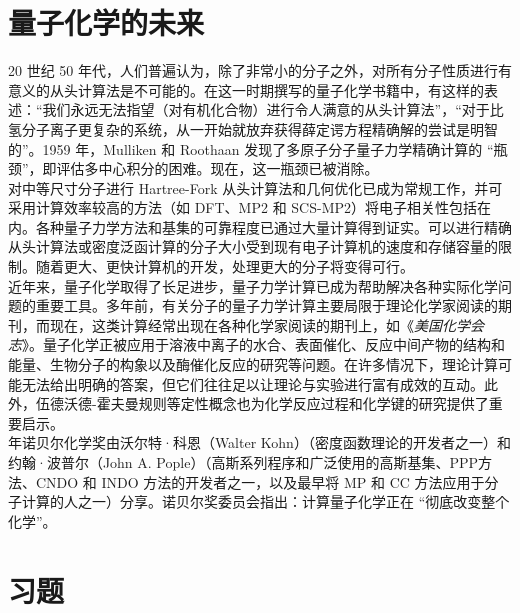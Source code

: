 \section{量子化学的未来}
\label{sec:17.8 The Future of Quantum Chemistry}
	20 世纪 50 年代，人们普遍认为，除了非常小的分子之外，对所有分子性质进行有意义的从头计算法是不可能的。在这一时期撰写的量子化学书籍中，有这样的表述：“我们永远无法指望（对有机化合物）进行令人满意的从头计算法”，“对于比氢分子离子更复杂的系统，从一开始就放弃获得薛定谔方程精确解的尝试是明智的”。1959 年，Mulliken 和 Roothaan 发现了多原子分子量子力学精确计算的 “瓶颈”，即评估多中心积分的困难。现在，这一瓶颈已被消除。\\
	\indent 对中等尺寸分子进行 Hartree-Fork 从头计算法和几何优化已成为常规工作，并可采用计算效率较高的方法（如 DFT、MP2 和 SCS-MP2）将电子相关性包括在内。各种量子力学方法和基集的可靠程度已通过大量计算得到证实。可以进行精确从头计算法或密度泛函计算的分子大小受到现有电子计算机的速度和存储容量的限制。随着更大、更快计算机的开发，处理更大的分子将变得可行。\\
	\indent 近年来，量子化学取得了长足进步，量子力学计算已成为帮助解决各种实际化学问 题的重要工具。多年前，有关分子的量子力学计算主要局限于理论化学家阅读的期刊，而现在，这类计算经常出现在各种化学家阅读的期刊上，如《\textit{美国化学会志}》。量子化学正被应用于溶液中离子的水合、表面催化、反应中间产物的结构和能量、生物分子的构象以及酶催化反应的研究等问题。在许多情况下，理论计算可能无法给出明确的答案，但它们往往足以让理论与实验进行富有成效的互动。此外，伍德沃德-霍夫曼规则等定性概念也为化学反应过程和化学键的研究提供了重要启示。\\
	 年诺贝尔化学奖由沃尔特·科恩（Walter Kohn）（密度函数理论的开发者之一）和约翰·波普尔（John A. Pople）（高斯系列程序和广泛使用的高斯基集、PPP方法、CNDO 和 INDO 方法的开发者之一，以及最早将 MP 和 CC 方法应用于分子计算的人之一）分享。诺贝尔奖委员会指出：计算量子化学正在 “彻底改变整个化学”。

\section*{习题}

